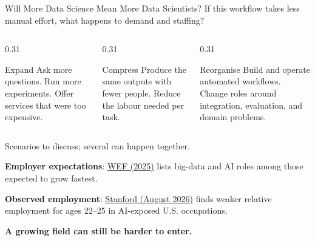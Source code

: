 \documentclass[aspectratio=169]{beamer}
\begin{document}
\begin{frame}{Will More Data Science Mean More Data Scientists?}
  \small If this workflow takes less manual effort, what happens to demand and staffing?
  \par\vspace{0.5em}
  \begin{columns}[T,onlytextwidth]
    \begin{column}{0.31\linewidth}
      \begin{block}{Expand}
        Ask more questions. Run more experiments. Offer services that were too expensive.
      \end{block}
    \end{column}
    \begin{column}{0.31\linewidth}
      \begin{block}{Compress}
        Produce the same outputs with fewer people. Reduce the labour needed per task.
      \end{block}
    \end{column}
    \begin{column}{0.31\linewidth}
      \begin{block}{Reorganise}
        Build and operate automated workflows. Change roles around integration, evaluation, and domain problems.
      \end{block}
    \end{column}
  \end{columns}
  \vspace{0.3em}
  Scenarios to discuss; several can happen together.
  \par\vspace{0.6em}
  {\footnotesize
  \textbf{Employer expectations}: \href{https://www.weforum.org/publications/the-future-of-jobs-report-2025/in-full/2-jobs-outlook/}{WEF (2025)} lists big-data and AI roles among those expected to grow fastest.
  \par\vspace{0.3em}
  \textbf{Observed employment}: \href{https://digitaleconomy.stanford.edu/publication/canaries-in-the-coal-mine-six-facts-about-the-recent-employment-effects-of-artificial-intelligence/}{Stanford (August 2026)} finds weaker relative employment for ages 22--25 in AI-exposed U.S. occupations.}
  \par\vspace{0.5em}
  \textbf{A growing field can still be harder to enter.}
\end{frame}
\end{document}
